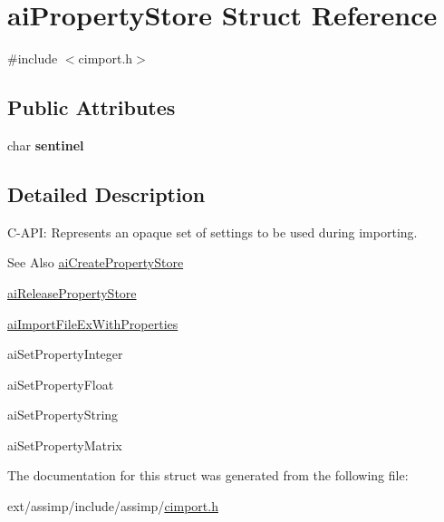 \hypertarget{structai_property_store}{\section{ai\-Property\-Store Struct Reference}
\label{structai_property_store}
}


{\ttfamily \#include $<$cimport.\-h$>$}

\subsection*{Public Attributes}
\begin{DoxyCompactItemize}
\item 
\hypertarget{structai_property_store_a53e97983bdbe38c596c7879555dc42a3}{char {\bfseries sentinel}}\label{structai_property_store_a53e97983bdbe38c596c7879555dc42a3}

\end{DoxyCompactItemize}


\subsection{Detailed Description}
C-\/\-A\-P\-I\-: Represents an opaque set of settings to be used during importing. \begin{DoxySeeAlso}{See Also}
\hyperlink{cimport_8h_a523d3d8b510203fb1a80d8702283f8c9}{ai\-Create\-Property\-Store} 

\hyperlink{cimport_8h_a579dddd75dbba5621c235df780ffc3e6}{ai\-Release\-Property\-Store} 

\hyperlink{cimport_8h_a9ec6845e46be4043cedb579bb85fcc0c}{ai\-Import\-File\-Ex\-With\-Properties} 

ai\-Set\-Property\-Integer 

ai\-Set\-Property\-Float 

ai\-Set\-Property\-String 

ai\-Set\-Property\-Matrix 
\end{DoxySeeAlso}


The documentation for this struct was generated from the following file\-:\begin{DoxyCompactItemize}
\item 
ext/assimp/include/assimp/\hyperlink{cimport_8h}{cimport.\-h}\end{DoxyCompactItemize}

